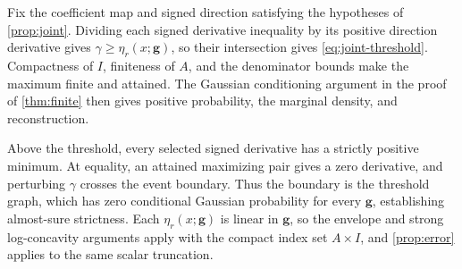 \begin{proofEnd}
Fix the coefficient map and signed direction satisfying the hypotheses
of \cref{prop:joint}.
Dividing each signed derivative inequality by its positive direction
derivative gives $\gamma\geq\eta_r(x;\boldsymbol g)$, so their intersection
gives \cref{eq:joint-threshold}. Compactness of $I$, finiteness
of $A$, and the denominator bounds make the maximum finite and attained.
The Gaussian conditioning argument in the proof of \cref{thm:finite} then gives
positive probability, the marginal density, and reconstruction.

Above the threshold, every selected signed derivative has a strictly
positive minimum. At equality, an attained maximizing pair gives a zero
derivative, and perturbing $\gamma$ crosses the event boundary. Thus the
boundary is the threshold graph, which has zero conditional Gaussian
probability for every $\boldsymbol g$, establishing almost-sure strictness. Each
$\eta_r(x;\boldsymbol g)$ is linear in $\boldsymbol g$, so the envelope
and strong log-concavity arguments apply with the compact index set
$A\times I$, and \cref{prop:error} applies to the same scalar truncation.
\end{proofEnd}
